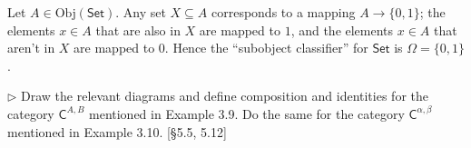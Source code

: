 \documentclass[12pt,letterpaper,boxed]{hmcpset}
\newcommand{\Obj}{\mathrm{Obj}}
\newcommand{\Set}{\mathsf{Set}}
\newcommand{\C}{\mathbb{C}}
\begin{document}
\begin{solution}
	\def \C {\mathsf{C}}
	\def \Set {\mathsf{Set}}
	
	Let $A\in\Obj(\Set)$. Any set $X\subseteq A$ corresponds to a mapping
	$A\to\{0,1\}$; the elements $x\in A$ that are also in $X$ are mapped to $1$, and
	the elements $x\in A$ that aren't in $X$ are mapped to $0$. Hence the
	``subobject classifier'' for $\Set$ is $\Omega=\{0,1\}$.
\end{solution}


\begin{problem}[3.11]
	$\rhd$ Draw the relevant diagrams and define composition and identities for the
	category $\mathsf{C}^{A,B}$ mentioned in Example 3.9. Do the same for the category
	$\mathsf{C}^{\alpha,\beta}$ mentioned in Example 3.10. [\S5.5, 5.12]
\end{problem}
\end{document}
